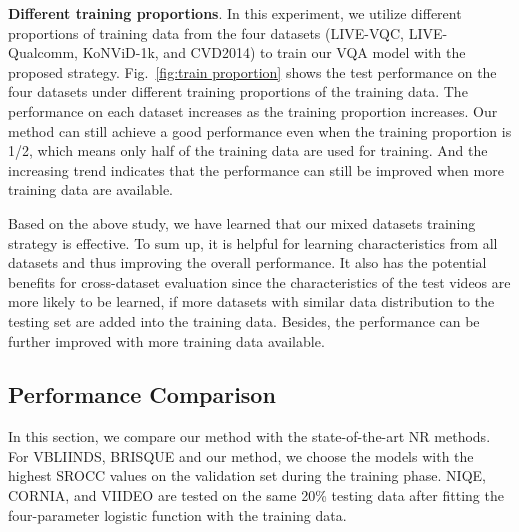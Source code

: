 \documentclass[twocolumn]{svjour3}          \smartqed  \usepackage{graphicx}
\begin{document}
\textbf{Different training proportions}.
In this experiment, we utilize different proportions of training data from the four datasets (LIVE-VQC, LIVE-Qualcomm, KoNViD-1k, and CVD2014) to train our VQA model with the proposed strategy. 
Fig.~\ref{fig:train proportion} shows the test performance on the four datasets under different training proportions of the training data. 
The performance on each dataset increases as the training proportion increases. 
Our method can still achieve a good performance even when the training proportion is 1/2, which means only half of the training data are used for training. 
And the increasing trend indicates that the performance can still be improved when more training data are available.

Based on the above study, we have learned that our mixed datasets training strategy is effective. 
To sum up, it is helpful for learning characteristics from all datasets and thus improving the overall performance. 
It also has the potential benefits for cross-dataset evaluation since the characteristics of the test videos are more likely to be learned, if more datasets with similar data distribution to the testing set are added into the training data. 
Besides, the performance can be further improved with more training data available.

\subsection{Performance Comparison}
\label{sec:performance}
In this section, we compare our method with the state-of-the-art NR methods.
For VBLIINDS, BRISQUE and our method, we choose the models with the highest SROCC values on the validation set during the training phase. 
NIQE, CORNIA, and VIIDEO are tested on the same 20\% testing data after fitting the four-parameter logistic function with the training data.
\end{document}
